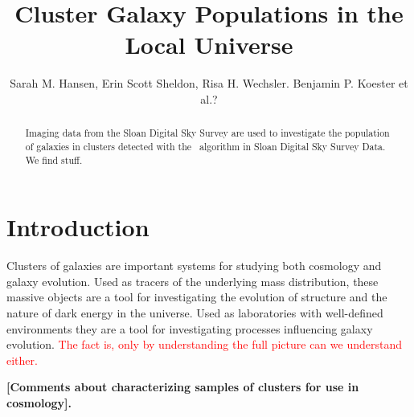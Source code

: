 \documentclass{emulateapj}
\begin{document}
\title{Cluster Galaxy Populations in the Local Universe}

\author{Sarah M. Hansen,
Erin Scott Sheldon,
Risa H. Wechsler.
Benjamin P. Koester
et al.?}


\begin{abstract}
  Imaging data from the Sloan Digital Sky Survey are used to
  investigate the population of galaxies in clusters detected with the
  \maxbcg\ algorithm in Sloan Digital Sky Survey Data. We find stuff. 

\end{abstract}



\section{Introduction}\label{sec:intro}

Clusters of galaxies are important systems for studying both cosmology and
galaxy evolution. Used as tracers of the underlying mass distribution, these
massive objects are a tool for investigating the evolution of structure and the
nature of dark energy in the universe.  Used as laboratories with well-defined
environments they are a tool for investigating processes influencing galaxy
evolution.  \textcolor{red}{The fact is, only by understanding the full picture
can we understand either.}

{\bf [Comments about characterizing samples of clusters for use in cosmology].}
\end{document}
